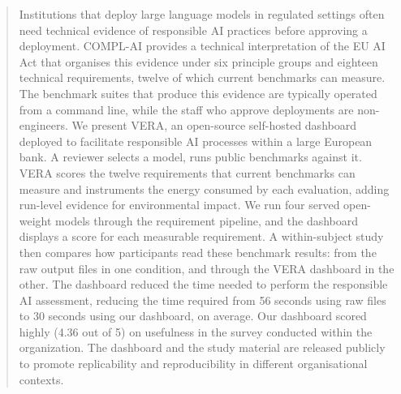\documentclass[10pt,conference]{IEEEtran}
\begin{document}
\begin{abstract}
Institutions that deploy large language models in regulated settings often need technical evidence of responsible AI practices before approving a deployment.
COMPL-AI provides a technical interpretation of the EU AI Act that organises this evidence under six principle groups and eighteen technical requirements, twelve of which current benchmarks can measure.
The benchmark suites that produce this evidence are typically operated from a command line, while the staff who approve deployments are non-engineers.
We present VERA, an open-source self-hosted dashboard deployed to facilitate responsible AI processes within a large European bank. A reviewer selects a model, runs public benchmarks against it.
VERA scores the twelve requirements that current benchmarks can measure and instruments the energy consumed by each evaluation, adding run-level evidence for environmental impact.
We run four served open-weight models through the requirement pipeline, and the dashboard displays a score for each measurable requirement. A within-subject study then compares how participants read these benchmark results: from the raw output files in one condition, and through the VERA dashboard in the other.
The dashboard reduced the time needed to perform the responsible AI assessment, reducing the time required from 56 seconds using raw files to 30 seconds using our dashboard, on average.
Our dashboard scored highly (4.36 out of 5) on usefulness in the survey conducted within the organization.
The dashboard and the study material are released publicly to promote replicability and reproducibility in different organisational contexts.
\end{abstract}
\end{document}
